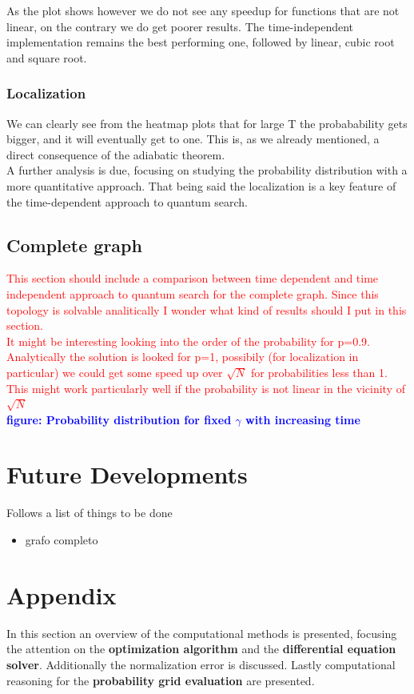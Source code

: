 \documentclass[aps,pra,reprint, onecolumn]{revtex4-2}
\newcommand{\red}[1]{\textcolor{red}{#1}}
\newcommand{\blue}[1]{\textcolor{blue}{\textbf{figure: #1}}}
\begin{document}
As the plot shows however we do not see any speedup for functions that are not linear, on the contrary we do get poorer results. The time-independent implementation remains the best performing one, followed by linear, cubic root and square root. 

\subsubsection{\textbf{Localization}}
We can clearly see from the heatmap plots that for large T the probabability gets bigger, and it will eventually get to one. This is, as we already mentioned, a direct consequence of the adiabatic theorem. \\ A further analysis is due, focusing on studying the probability distribution with a more quantitative approach. That being said the localization is a key feature of the time-dependent approach to quantum search. 

\subsection{Complete graph}
\red{This section should include a comparison between time dependent and time independent approach to quantum search for the complete graph. Since this topology is solvable analitically I wonder what kind of results should I put in this section.\\ It might be interesting looking into the order of the probability for p=0.9. Analytically the solution is looked for p=1, possibily (for localization in particular) we could get some speed up over $\sqrt{N}$ for probabilities less than 1. This might work particularly well if the probability is not linear in the vicinity of $\sqrt{N}$ }\\ \blue{Probability distribution for fixed $\gamma$ with increasing time}


\section{Future Developments}
Follows a list of things to be done
\begin{itemize}
	\item grafo completo

\end{itemize}

\section{Appendix}
In this section an overview of the computational methods is presented, focusing the attention on the \textbf{optimization algorithm} and the \textbf{differential equation solver}. Additionally the normalization error is discussed. Lastly computational reasoning for the \textbf{probability grid evaluation} are presented. \\
\end{document}
